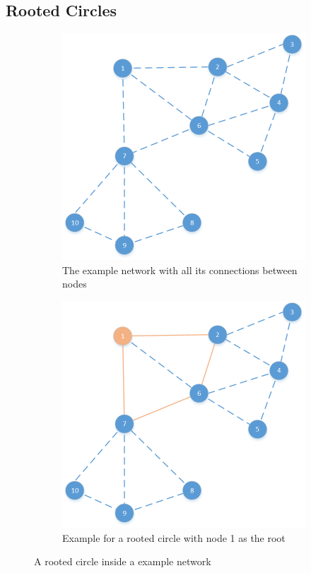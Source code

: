 \subsection{Rooted Circles}
\begin{figure}[htbp]
	\centering
	\begin{subfigure}[t]{0.4\textwidth}
		\centering
    		\includegraphics[scale=0.6]{content/images/Schedule/Network}
   	 	\caption{The example network with all its connections between nodes}
    	\label{fig:network}
    \end{subfigure}
    \quad
    \quad
    \begin{subfigure}[t]{0.4\textwidth}
		\centering         
        \includegraphics[scale=0.6]{content/images/Schedule/RootedCircle}
        \caption{Example for a rooted circle with node 1 as the root}
        \label{fig:rootedCircle}
    \end{subfigure}
    \label{fig:networkRootedCircle}
    \caption{A rooted circle inside a example network}
\end{figure}

